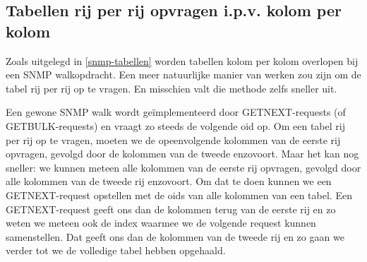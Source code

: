 
\subsection{Tabellen rij per rij opvragen i.p.v. kolom per kolom}
\label{rij-per-rij}

Zoals uitgelegd in \cref{snmp-tabellen} worden tabellen kolom per kolom overlopen bij een SNMP walkopdracht.
Een meer natuurlijke manier van werken zou zijn om de tabel rij per rij op te vragen.
En misschien valt die methode zelfs sneller uit.

Een gewone SNMP walk wordt geïmplementeerd door GETNEXT-requests (of GETBULK-requests)
en vraagt zo steeds de volgende \gls{oid} op.
Om een tabel rij per rij op te vragen, moeten we de opeenvolgende kolommen van de eerste rij opvragen, gevolgd door de kolommen van de tweede enzovoort.
Maar het kan nog sneller: we kunnen meteen alle kolommen van de eerste rij opvragen, gevolgd door alle kolommen van de tweede rij enzovoort.
Om dat te doen kunnen we een GETNEXT-request opstellen met de \glspl{oid} van alle kolommen van een tabel.
Een GETNEXT-request geeft ons dan de kolommen terug van de eerste rij en zo weten we meteen ook de index waarmee we de volgende request kunnen samenstellen.
Dat geeft ons dan de kolommen van de tweede rij en zo gaan we verder tot we de volledige tabel hebben opgehaald.


